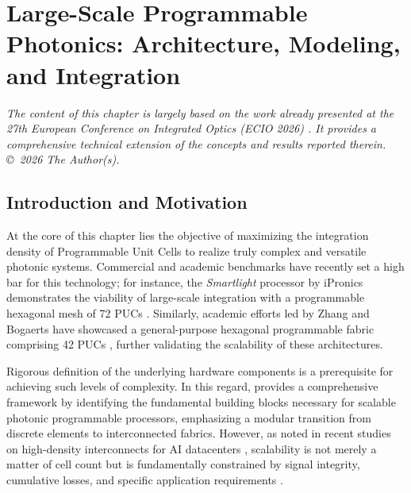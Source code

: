 
\chapter{Large-Scale Programmable Photonics: Architecture, Modeling, and Integration}
\label{chap:systems}

\begin{center}
    \textit{The content of this chapter is largely based on the work already presented at 
    the 27th European Conference on Integrated Optics (ECIO 2026) \cite{Santome2026_ECIO}. It 
    provides a comprehensive technical extension of the concepts and results reported therein.
    \copyright~2026 The Author(s).}
\end{center}
\vspace{1em}

\section{Introduction and Motivation}

At the core of this chapter lies the objective of maximizing the integration density of 
Programmable Unit Cells to realize truly complex and versatile photonic systems. Commercial and 
academic benchmarks have recently set a high bar for this technology; for instance, the 
\textit{Smartlight} processor by iPronics demonstrates the viability of large-scale integration 
with a programmable hexagonal mesh of 72 PUCs 
\cite{perez-lopezGeneralpurposeProgrammablePhotonic2024a}. Similarly, academic efforts led by Zhang 
and Bogaerts have showcased a general-purpose hexagonal programmable fabric comprising 42 PUCs 
\cite{zhangGeneralPurposeHexagonalProgrammable2026}, further validating the scalability of these 
architectures. 

Rigorous definition of the underlying hardware components is a prerequisite for achieving such 
levels of complexity. In this regard, \cite{gomez-hidalgoFundamentalBuildingBlocks2026} provides a 
comprehensive framework by identifying the fundamental building blocks necessary for scalable 
photonic programmable processors, emphasizing a modular transition from discrete elements to 
interconnected fabrics. However, as noted in recent studies on high-density interconnects for AI 
datacenters \cite{torrijos-moranIndustryInsightPhotonics2026}, scalability is not merely a matter 
of cell count but is fundamentally constrained by signal integrity, cumulative losses, and specific 
application requirements \cite{fanTechnology800GOptical2026}.

